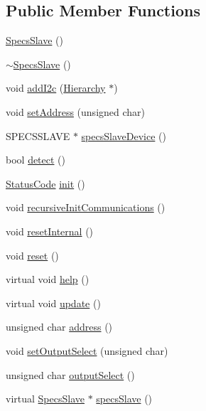 \subsection*{Public Member Functions}
\begin{DoxyCompactItemize}
\item 
\hyperlink{classSpecsSlave_a4170ce73e2fd5ce2b8a7b8ef55226556}{Specs\+Slave} ()
\item 
\hyperlink{classSpecsSlave_a8194c1d1a4e7a0e250e5b7dd72b0b437}{$\sim$\+Specs\+Slave} ()
\item 
void \hyperlink{classSpecsSlave_af462b4d6e716ceb4bd454ad835938737}{add\+I2c} (\hyperlink{classHierarchy}{Hierarchy} $\ast$)
\item 
void \hyperlink{classSpecsSlave_a1e5917c1f323cd7b4aabe4940c6baf12}{set\+Address} (unsigned char)
\item 
S\+P\+E\+C\+S\+S\+L\+A\+VE $\ast$ \hyperlink{classSpecsSlave_a44970aca61b6fdcd6d6d90e6601093f3}{specs\+Slave\+Device} ()
\item 
bool \hyperlink{classSpecsSlave_aa1411ca849bda04215518b08535185e2}{detect} ()
\item 
\hyperlink{classStatusCode}{Status\+Code} \hyperlink{classSpecsSlave_ab34b5117373a334027d3a5cf33287bb6}{init} ()
\item 
void \hyperlink{classSpecsSlave_a347b94c2ba660ccde6927fe72590a1bc}{recursive\+Init\+Communications} ()
\item 
void \hyperlink{classSpecsSlave_aa4f2493eabe522bb6651abcd67a6a690}{reset\+Internal} ()
\item 
void \hyperlink{classSpecsSlave_a6c69baff5941cabed2947f547041bbeb}{reset} ()
\item 
virtual void \hyperlink{classSpecsInterface_a24bf2b5e2da6c675ba5de3b226481a73}{help} ()
\item 
virtual void \hyperlink{classSpecsInterface_af17ca5c8d48bea81f84e503b2994f5da}{update} ()
\item 
unsigned char \hyperlink{classSpecsInterface_a0fa039a15b842a5ba783ce825b9915d8}{address} ()
\item 
void \hyperlink{classSpecsInterface_a1907d360f2bda367cfb1d39e379c6493}{set\+Output\+Select} (unsigned char)
\item 
unsigned char \hyperlink{classSpecsInterface_ab291ed03f4c2f0143e14c26ad5f648dd}{output\+Select} ()
\item 
virtual \hyperlink{classSpecsSlave}{Specs\+Slave} $\ast$ \hyperlink{classSpecsInterface_a13cf39bddfa8ba21d6e6aa78e78f0e4f}{specs\+Slave} ()

\end{DoxyCompactItemize}
